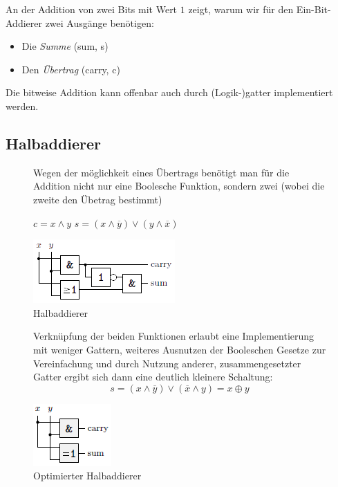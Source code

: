 \documentclass[12pt]{report}
\begin{document}
An der Addition von zwei Bits mit Wert $1$ zeigt, warum wir für den Ein-Bit-Addierer zwei Ausgänge benötigen:
\begin{itemize}
  \item Die \textit{Summe} (sum, s)
  \item Den \textit{Übertrag} (carry, c)
\end{itemize}
Die bitweise Addition kann offenbar auch durch (Logik-)gatter implementiert werden.


\subsection{Halbaddierer}
\begin{figure}[H]
  \begin{minipage}[t]{.45\textwidth}
    Wegen der möglichkeit eines Übertrags benötigt man für die Addition nicht nur eine Boolesche Funktion, 
    sondern zwei (wobei die zweite den Übetrag bestimmt)
    
    \begin{center}
      $c = x \wedge y$ $s = (x \wedge \overline{y}) \vee (y \wedge \overline{x})$
    \end{center}
  \end{minipage}
  \hfill
  \begin{minipage}[t]{.45\textwidth}
    \caption{Halbaddierer}
    \centering
    \includegraphics{halbaddierer_01}
  \end{minipage}
\end{figure}

\begin{figure}[H]
  \begin{minipage}[t]{.45\textwidth}
    Verknüpfung der beiden Funktionen erlaubt eine Implementierung mit weniger Gattern, 
    weiteres Ausnutzen der Booleschen Gesetze zur Vereinfachung und
    durch Nutzung anderer, zusammengesetzter Gatter ergibt sich dann eine deutlich kleinere Schaltung:
    $$ s = (x \wedge \overline{y}) \vee (\overline{x} \wedge y) = x \oplus y $$
  \end{minipage}
  \hfill
  \begin{minipage}[t]{.45\textwidth}
    \caption{Optimierter Halbaddierer}
    \centering
    \includegraphics[scale=1.3]{halbaddierer_optimiert}
  \end{minipage}
\end{figure}
\end{document}
